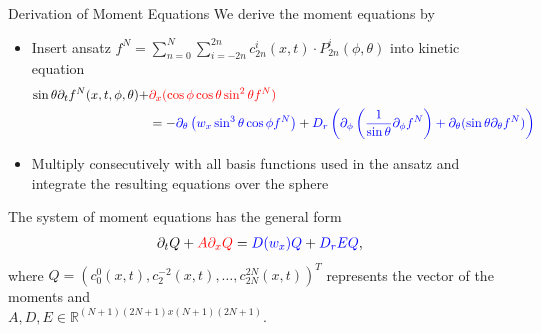 \begin{frame}{Derivation of Moment Equations}
	\scriptsize
	We derive the moment equations by
	\begin{itemize}
		\item Insert ansatz $f^N =  \sum_{n=0}^{N} \sum_{i=-2n}^{2n} c^i_{2n}(x,t) \cdot P^i_{2n}(\phi, \theta)$ into kinetic equation
\begin{align*}
\sin\theta \partial_{t}f^N(x,t,\phi,\theta) + &  \textcolor{red}{\partial_x (\cos\phi \cos\theta \sin^2\theta f^N)} \\
	& 
	 =- \textcolor{blue}{\partial_\theta \left(w_x \sin^3 \theta \cos \phi f^N\right)} +\textcolor{blue}{D_{r} \left( \partial_\phi \left(\frac{1}{\sin \theta} \partial_\phi f^N \right) + \partial_\theta (\sin \theta \partial_\theta f^N) \right)}
\end{align*}
		\item Multiply consecutively with all basis functions used in the ansatz and integrate the resulting equations over the sphere
	\end{itemize}
\pause
The system of moment equations has the general form
\begin{align}
	\partial_t Q + \textcolor{red}{A\partial_x Q} = \textcolor{blue}{D(w_x)Q}+ \textcolor{blue}{D_rE Q},
\end{align}
where $Q=(c^0_0(x,t), c^{-2}_2(x,t), \ldots, c^{2N}_{2N}(x,t))^T$ represents the vector of the moments and \\
\vspace{2mm}
$A,D,E \in \mathbb{R}^{(N+1)(2N+1)x(N+1)(2N+1)}$.
\end{frame}

